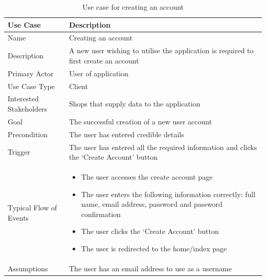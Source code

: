 \documentclass[10pt,twocolumn]{witseiepaper}
\begin{document}
		\begin{table}[htbp]
			\centering
			\caption{Use case for creating an account}
			\label{uc:create_account}
			\begin{tabular}{|p{}|p{}|}
				\hline
				\textbf{Use Case} & \textbf{Description} \\ \hline
				Name &  Creating an account \\ \hline
				Description & A new user wishing to utilise the application is required to first create an account \\ \hline
				Primary Actor & User of application \\ \hline
				Use Case Type & Client \\ \hline
				Interested Stakeholders & Shops that supply data to the application \\ \hline
				Goal & The successful creation of a new user account \\ \hline
				Precondition & The user has entered credible details \\ \hline
				Trigger & The user has entered all the required information and clicks the `Create Account' button \\ \hline
				Typical Flow of Events & 
				\begin{itemize}
					\item The user accesses the create account page
					\item The user enters the following information correctly: full name, email address, password and password confirmation
					\item The user clicks the `Create Account' button
					\item The user is redirected to the home/index page
				\end{itemize}
				 \\ \hline
				Assumptions & The user has an email address to use as a username \\
				\hline
			\end{tabular}
		\end{table}
		
\end{document}
